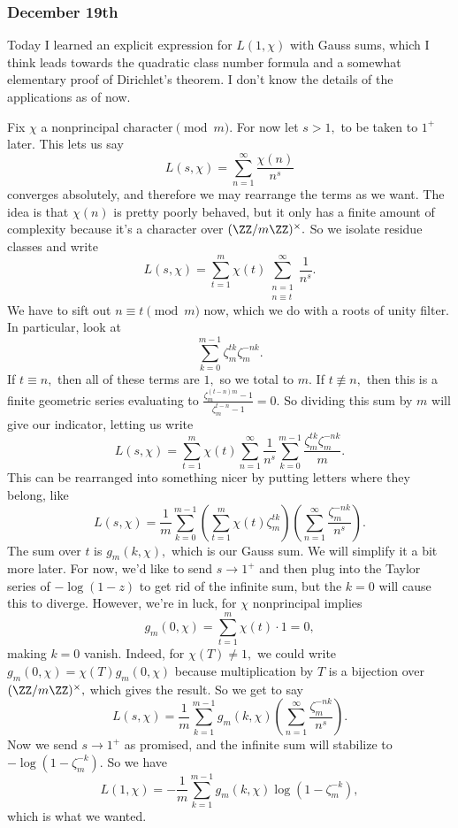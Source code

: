 \subsubsection{December 19th}
Today I learned an explicit expression for $L(1,\chi)$ with Gauss sums, which I think leads towards the quadratic class number formula and a somewhat elementary proof of Dirichlet's theorem. I don't know the details of the applications as of now.

Fix $\chi$ a nonprincipal character$\pmod m.$ For now let $s>1,$ to be taken to $1^+$ later. This lets us say
\[L(s,\chi)=\sum_{n=1}^\infty\frac{\chi(n)}{n^s}\]
converges absolutely, and therefore we may rearrange the terms as we want. The idea is that $\chi(n)$ is pretty poorly behaved, but it only has a finite amount of complexity because it's a character over $(\ZZ/m\ZZ)^\times.$ So we isolate residue classes and write
\[L(s,\chi)=\sum_{t=1}^m\chi(t)\sum_{\substack{n=1\\n\equiv t}}^\infty\frac1{n^s}.\]
We have to sift out $n\equiv t\pmod m$ now, which we do with a roots of unity filter. In particular, look at
\[\sum_{k=0}^{m-1}\zeta_m^{tk}\zeta_m^{-nk}.\]
If $t\equiv n,$ then all of these terms are $1,$ so we total to $m.$ If $t\not\equiv n,$ then this is a finite geometric series evaluating to $\frac{\zeta_m^{(t-n)m}-1}{\zeta_m^{t-n}-1}=0.$ So dividing this sum by $m$ will give our indicator, letting us write
\[L(s,\chi)=\sum_{t=1}^m\chi(t)\sum_{n=1}^\infty\frac1{n^s}\sum_{k=0}^{m-1}\frac{\zeta_m^{tk}\zeta_m^{-nk}}m.\]
This can be rearranged into something nicer by putting letters where they belong, like
\[L(s,\chi)=\frac1m\sum_{k=0}^{m-1}\left(\sum_{t=1}^m\chi(t)\zeta_m^{tk}\right)\left(\sum_{n=1}^\infty\frac{\zeta_m^{-nk}}{n^s}\right).\]
The sum over $t$ is $g_m(k,\chi),$ which is our Gauss sum. We will simplify it a bit more later. For now, we'd like to send $s\to1^+$ and then plug into the Taylor series of $-\log(1-z)$ to get rid of the infinite sum, but the $k=0$ will cause this to diverge. However, we're in luck, for $\chi$ nonprincipal implies
\[g_m(0,\chi)=\sum_{t=1}^m\chi(t)\cdot1=0,\]
making $k=0$ vanish. Indeed, for $\chi(T)\ne1,$ we could write $g_m(0,\chi)=\chi(T)g_m(0,\chi)$ because multiplication by $T$ is a bijection over $(\ZZ/m\ZZ)^\times,$ which gives the result. So we get to say
\[L(s,\chi)=\frac1m\sum_{k=1}^{m-1}g_m(k,\chi)\left(\sum_{n=1}^\infty\frac{\zeta_m^{-nk}}{n^s}\right).\]
Now we send $s\to1^+$ as promised, and the infinite sum will stabilize to $-\log\left(1-\zeta_m^{-k}\right).$ So we have
\[L(1,\chi)=-\frac1m\sum_{k=1}^{m-1}g_m(k,\chi)\log\left(1-\zeta_m^{-k}\right),\]
which is what we wanted.

